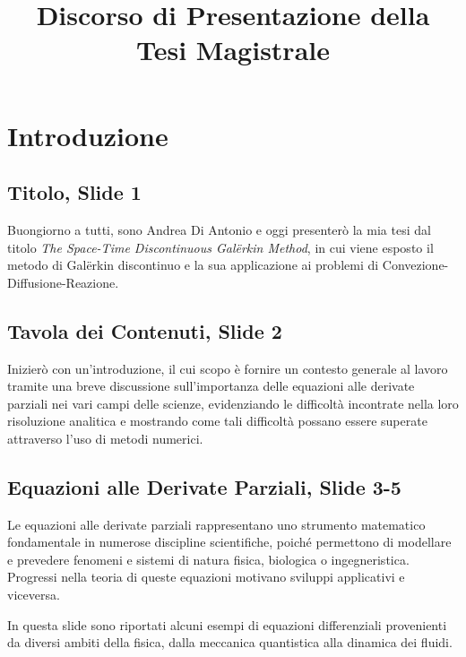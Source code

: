 \documentclass[12pt]{article}
\title{Discorso di Presentazione della Tesi Magistrale \\ \documenttitle}
\begin{document}

    \maketitle
    \tableofcontents


    \newpage
    
    \newpage
    \section{Introduzione}

    \subsection{Titolo, Slide 1}

    Buongiorno a tutti, sono Andrea Di Antonio e oggi presenterò la mia tesi dal titolo \textit{The Space-Time Discontinuous Galërkin Method}, in cui viene esposto il metodo di Galërkin discontinuo e la sua applicazione ai problemi di Convezione-Diffusione-Reazione.

    \subsection{Tavola dei Contenuti, Slide 2}

    Inizierò con un'introduzione, il cui scopo è fornire un contesto generale al lavoro tramite una breve discussione sull'importanza delle equazioni alle derivate parziali nei vari campi delle scienze, evidenziando le difficoltà incontrate nella loro risoluzione analitica e mostrando come tali difficoltà possano essere superate attraverso l'uso di metodi numerici.

    \subsection{Equazioni alle Derivate Parziali, Slide 3-5}

    Le equazioni alle derivate parziali rappresentano uno strumento matematico fondamentale in numerose discipline scientifiche, poiché permettono di modellare e prevedere fenomeni e sistemi di natura fisica, biologica o ingegneristica. Progressi nella teoria di queste equazioni motivano sviluppi applicativi e viceversa.

    In questa slide sono riportati alcuni esempi di equazioni differenziali provenienti da diversi ambiti della fisica, dalla meccanica quantistica alla dinamica dei fluidi.
\end{document}
